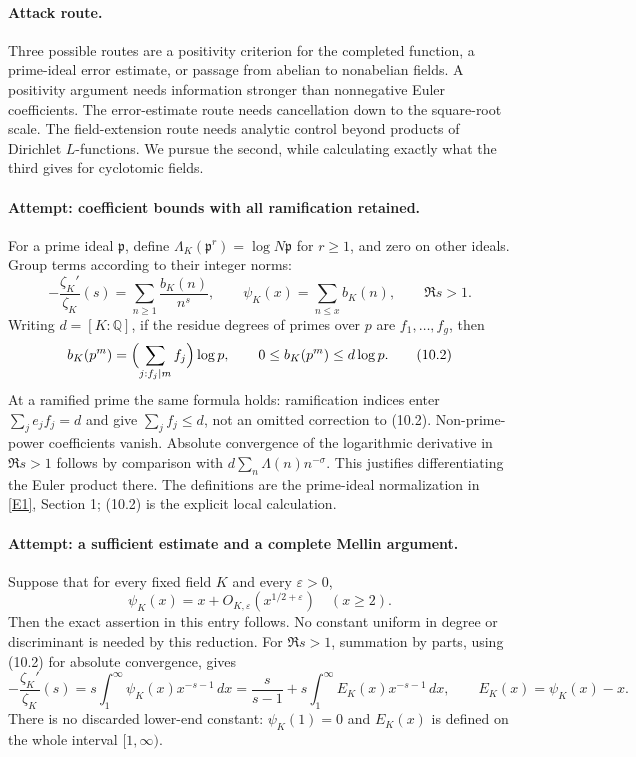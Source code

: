 \documentclass[11pt,a4paper]{article}
\newcommand{\Q}{\mathbb{Q}}
\newcommand{\eref}[2]{\hyperlink{extra:#1:#2}{[E#2]}}
\begin{document}
\paragraph{Attack route.}
Three possible routes are a positivity criterion for the completed
function, a prime-ideal error estimate, or passage from abelian to
nonabelian fields. A positivity argument needs information stronger
than nonnegative Euler coefficients. The error-estimate route needs
cancellation down to the square-root scale. The field-extension route
needs analytic control beyond products of Dirichlet $L$-functions.
We pursue the second, while calculating exactly what the third gives
for cyclotomic fields.

\paragraph{Attempt: coefficient bounds with all ramification retained.}
For a prime ideal $\mathfrak p$, define
$\Lambda_K(\mathfrak p^r)=\log N\mathfrak p$ for $r\geq1$, and
zero on other ideals. Group terms according to their integer norms:
\[
 -\frac{\zeta_K'}{\zeta_K}(s)
 =\sum_{n\geq1}\frac{b_K(n)}{n^s},\qquad
 \psi_K(x)=\sum_{n\leq x}b_K(n),\qquad \Re s>1. \tag{10.1}
\]
Writing $d=[K:\Q]$, if the residue degrees of primes over $p$ are
$f_1,\ldots,f_g$, then
\[
 b_K(p^m)=\Bigl(\sum_{j:f_j\mid m}f_j\Bigr)\log p,
 \qquad 0\leq b_K(p^m)\leq d\log p. \tag{10.2}
\]
At a ramified prime the same formula holds: ramification indices enter
$\sum_j e_jf_j=d$ and give $\sum_jf_j\leq d$, not an omitted correction
to (10.2). Non-prime-power coefficients vanish. Absolute convergence of
the logarithmic derivative in $\Re s>1$ follows by comparison with
$d\sum_n\Lambda(n)n^{-\sigma}$. This justifies differentiating the
Euler product there. The definitions are the prime-ideal normalization
in \eref{30006677}{1}, Section 1; (10.2) is the explicit local calculation.

\paragraph{Attempt: a sufficient estimate and a complete Mellin argument.}
Suppose that for every fixed field $K$ and every $\varepsilon>0$,
\[
 \psi_K(x)=x+O_{K,\varepsilon}(x^{1/2+\varepsilon})
 \quad(x\geq2). \tag{10.3}
\]
Then the exact assertion in this entry follows. No constant uniform
in degree or discriminant is needed by this reduction.
For $\Re s>1$, summation by parts, using (10.2) for absolute convergence,
gives
\[
 -\frac{\zeta_K'}{\zeta_K}(s)
 =s\int_1^\infty\psi_K(x)x^{-s-1}\,dx
 =\frac{s}{s-1}+s\int_1^\infty E_K(x)x^{-s-1}\,dx,
 \qquad E_K(x)=\psi_K(x)-x. \tag{10.4}
\]
There is no discarded lower-end constant: $\psi_K(1)=0$ and
$E_K(x)$ is defined on the whole interval $[1,\infty)$.
\end{document}
